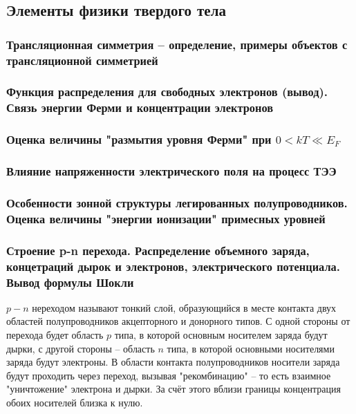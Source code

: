 \subsection{Элементы физики твердого тела}

\subsubsection{Трансляционная симметрия --  определение, примеры объектов с трансляционной симметрией}

\subsubsection{Функция распределения для свободных электронов (вывод). Связь энергии Ферми и концентрации электронов}



\subsubsection{Оценка величины "размытия уровня Ферми" при $0 < kT \ll E_F$}

\subsubsection{Влияние напряженности электрического поля на процесс ТЭЭ}

\subsubsection{Особенности зонной структуры легированных полупроводников. Оценка величины "энергии ионизации" примесных уровней}

\subsubsection{Строение p-n перехода. Распределение объемного заряда, концетраций дырок и электронов, электрического потенциала. Вывод формулы Шокли}

$p-n$ нереходом называют тонкий слой, образующийся в месте контакта двух областей полупроводников
акцепторного и донорного типов. С одной стороны от перехода будет область $p$ типа, в которой
основным носителем заряда будут дырки, с другой стороны -- область $n$ типа, в которой основными
носителями заряда будут электроны. В области контакта полупроводников носители заряда будут
проходить через переход, вызывая "рекомбинацию" -- то есть взаимное "уничтожение" электрона и дырки.
За счёт этого вблизи границы концентрация обоих носителей близка к нулю.

